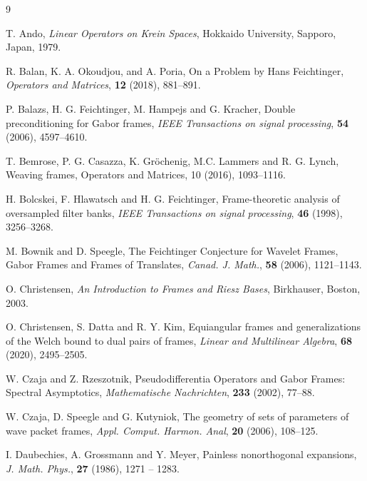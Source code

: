 \documentclass[article,12pt]{amsart}
\begin{document}




\begin{thebibliography}{9}

 T. Ando,  \emph{Linear Operators on Krein Spaces}, Hokkaido University, Sapporo, Japan, 1979.

 R. Balan, K. A. Okoudjou, and A. Poria, On a Problem by Hans Feichtinger, \emph{Operators and Matrices},  \textbf{12} (2018),  881--891.

 P. Balazs, H. G. Feichtinger, M. Hampejs and G. Kracher, Double preconditioning for Gabor frames, \emph{IEEE Transactions on signal processing},  \textbf{54} (2006),  4597--4610.

 T. Bemrose, P. G. Casazza, K. Gr{\"o}chenig, M.C. Lammers and R. G. Lynch, Weaving frames, Operators and Matrices, 10 (2016), 1093--1116.

 H. Bolcskei, F. Hlawatsch and H. G. Feichtinger, Frame-theoretic analysis of oversampled filter banks, \emph{IEEE Transactions on signal processing},  \textbf{46} (1998),  3256--3268.

M. Bownik and D. Speegle,  The Feichtinger Conjecture for Wavelet  Frames, Gabor Frames and
Frames of Translates,  \emph{Canad. J. Math.}, \textbf{58} (2006), 1121--1143.


 O. Christensen,  \emph{An Introduction to Frames and Riesz Bases}, Birkhauser, Boston, 2003.

O. Christensen, S. Datta and R. Y. Kim, Equiangular frames and generalizations of the Welch bound to dual pairs of frames, \emph{Linear and Multilinear Algebra},  \textbf{68} (2020), 2495--2505.

W. Czaja and Z. Rzeszotnik,  Pseudodifferentia Operators and Gabor Frames: Spectral Asymptotics,  \emph{Mathematische Nachrichten}, \textbf{233} (2002), 77--88.

W. Czaja, D. Speegle and G. Kutyniok,  The geometry of sets of parameters of wave packet frames,  \emph{Appl. Comput. Harmon. Anal}, \textbf{20} (2006), 108--125.


 I. Daubechies, A. Grossmann and Y. Meyer, Painless nonorthogonal expansions, \emph{J. Math. Phys.}, \textbf{27} (1986), 1271 -- 1283.


\end{thebibliography}
\end{document}
